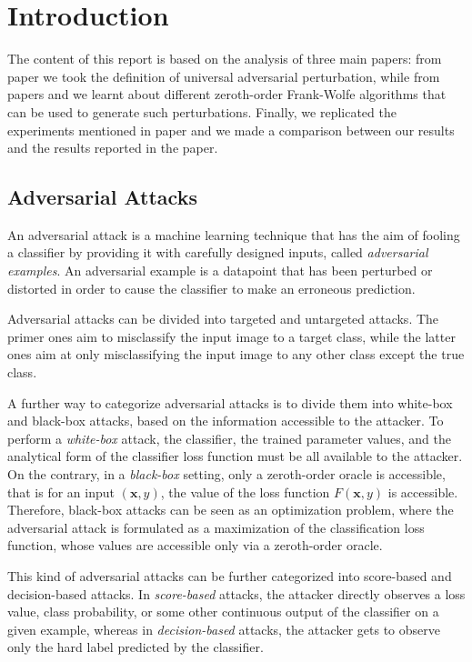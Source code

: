 \section{Introduction}
The content of this report is based on the analysis of three main papers:
from paper \cite{A2} we took the definition of universal adversarial perturbation, while from papers \cite{A3} and
\cite{A4} we learnt about different zeroth-order Frank-Wolfe algorithms that can be used to generate such perturbations.
Finally, we replicated the experiments mentioned in paper \cite{A3} and we made a comparison between our results and
the results reported in the paper.

\subsection{Adversarial Attacks}
An adversarial attack is a machine learning technique that has the aim of fooling a classifier by providing it with
carefully designed inputs, called \textit{adversarial examples}. An adversarial example is a datapoint that has
been perturbed or distorted in order to cause the classifier to make an erroneous prediction.

Adversarial attacks can be divided into targeted and untargeted attacks. The primer ones aim to
misclassify the input image to a target class, while the latter ones aim at only misclassifying
the input image to any other class except the true class.

A further way to categorize adversarial attacks is to divide them into white-box and black-box attacks, based on
the information accessible to the attacker. To perform a \textit{white-box} attack, the classifier, the trained
parameter values, and the analytical form of the classifier loss function must be all available to the attacker. On
the contrary, in a \textit{black-box} setting, only a zeroth-order oracle is accessible, that is for an input $(\mathbf{x},y)$,
the value of the loss function $F(\mathbf{x},y)$ is accessible. Therefore, black-box attacks can be seen as an optimization problem,
where the adversarial attack is formulated as a maximization of the classification loss function, whose values are
accessible only via a zeroth-order oracle.

This kind of adversarial attacks can be further categorized into score-based and decision-based attacks.
In \textit{score-based} attacks, the attacker directly observes a loss value, class probability, or some other
continuous output of the classifier on a given example, whereas in \textit{decision-based} attacks, the attacker gets to
observe only the hard label predicted by the classifier.

